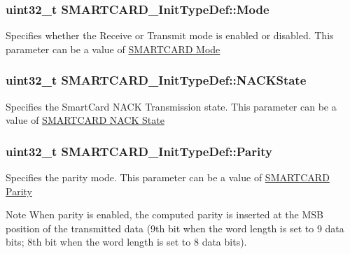 \subsubsection[{\texorpdfstring{Mode}{Mode}}]{\setlength{\rightskip}{0pt plus 5cm}uint32\+\_\+t S\+M\+A\+R\+T\+C\+A\+R\+D\+\_\+\+Init\+Type\+Def\+::\+Mode}\hypertarget{struct_s_m_a_r_t_c_a_r_d___init_type_def_acf1faf22e7003550470b97b9f77425f9}{}\label{struct_s_m_a_r_t_c_a_r_d___init_type_def_acf1faf22e7003550470b97b9f77425f9}
Specifies whether the Receive or Transmit mode is enabled or disabled. This parameter can be a value of \hyperlink{group___s_m_a_r_t_c_a_r_d___mode}{S\+M\+A\+R\+T\+C\+A\+RD Mode} 
\subsubsection[{\texorpdfstring{N\+A\+C\+K\+State}{NACKState}}]{\setlength{\rightskip}{0pt plus 5cm}uint32\+\_\+t S\+M\+A\+R\+T\+C\+A\+R\+D\+\_\+\+Init\+Type\+Def\+::\+N\+A\+C\+K\+State}\hypertarget{struct_s_m_a_r_t_c_a_r_d___init_type_def_a3be795a888d187da69f8dcdfab38da74}{}\label{struct_s_m_a_r_t_c_a_r_d___init_type_def_a3be795a888d187da69f8dcdfab38da74}
Specifies the Smart\+Card N\+A\+CK Transmission state. This parameter can be a value of \hyperlink{group___smart_card___n_a_c_k___state}{S\+M\+A\+R\+T\+C\+A\+RD N\+A\+CK State} 
\subsubsection[{\texorpdfstring{Parity}{Parity}}]{\setlength{\rightskip}{0pt plus 5cm}uint32\+\_\+t S\+M\+A\+R\+T\+C\+A\+R\+D\+\_\+\+Init\+Type\+Def\+::\+Parity}\hypertarget{struct_s_m_a_r_t_c_a_r_d___init_type_def_aaefc9fdd7fd84b066ded393a3830743f}{}\label{struct_s_m_a_r_t_c_a_r_d___init_type_def_aaefc9fdd7fd84b066ded393a3830743f}
Specifies the parity mode. This parameter can be a value of \hyperlink{group___s_m_a_r_t_c_a_r_d___parity}{S\+M\+A\+R\+T\+C\+A\+RD Parity} \begin{DoxyNote}{Note}
When parity is enabled, the computed parity is inserted at the M\+SB position of the transmitted data (9th bit when the word length is set to 9 data bits; 8th bit when the word length is set to 8 data bits). 
\end{DoxyNote}
